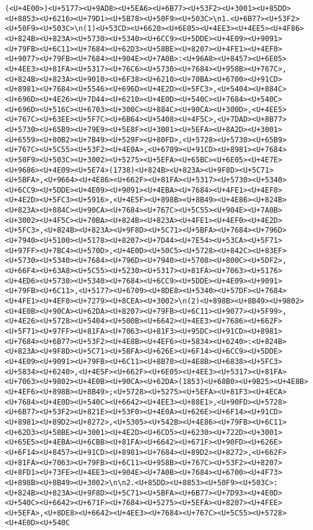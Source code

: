 \documentclass[
]{article}
\begin{document}
\begin{verbatim}
(<U+4E00>)<U+5177><U+9AD8><U+5EA6><U+6B77><U+53F2><U+3001><U+85DD><U+8853><U+6216><U+79D1><U+5B78><U+50F9><U+503C>\n1.<U+6B77><U+53F2><U+50F9><U+503C>\n(1)<U+53CD><U+6620><U+6E05><U+4EE3><U+4EE5><U+4F86><U+824B><U+823A><U+5730><U+5340><U+6CC9><U+5DDE><U+4E09><U+9091><U+79FB><U+6C11><U+7684><U+62D3><U+58BE><U+8207><U+4FE1><U+4EF0><U+9077><U+79FB><U+7684><U+904E><U+7A0B>:<U+96A8><U+8457><U+6E05><U+4EE3><U+81FA><U+5317><U+76C6><U+5730><U+7684><U+958B><U+767C>,<U+824B><U+823A><U+9010><U+6F38><U+6210><U+70BA><U+6700><U+91CD><U+8981><U+7684><U+5546><U+696D><U+4E2D><U+5FC3>,<U+5404><U+884C><U+696D><U+4E26><U+7D44><U+6210><U+4E0D><U+540C><U+7684><U+540C><U+696D><U+516C><U+6703><U+300C><U+884C><U+90CA><U+300D>,<U+4EE5><U+767C><U+63EE><U+5F7C><U+6B64><U+5408><U+4F5C>,<U+7DAD><U+8B77><U+5730><U+65B9><U+79E9><U+5E8F><U+3001><U+5EFA><U+8A2D><U+3001><U+6559><U+80B2><U+7B49><U+529F><U+80FD>,<U+5728><U+5730><U+65B9><U+767C><U+5C55><U+53F2><U+4E0A>,<U+6709><U+91CD><U+8981><U+7684><U+50F9><U+503C><U+3002><U+5275><U+5EFA><U+65BC><U+6E05><U+4E7E><U+9686><U+4E09><U+5E74>(1738)<U+824B><U+823A><U+9F8D><U+5C71><U+5BFA>,<U+9664><U+4E86><U+662F><U+81FA><U+5317><U+5730><U+5340><U+6CC9><U+5DDE><U+4E09><U+9091><U+4EBA><U+7684><U+4FE1><U+4EF0><U+4E2D><U+5FC3><U+5916>,<U+4E5F><U+898B><U+8B49><U+4E86><U+824B><U+823A><U+884C><U+90CA><U+7684><U+767C><U+5C55><U+904E><U+7A0B><U+3002><U+4F5C><U+70BA><U+824B><U+823A><U+4FE1><U+4EF0><U+4E2D><U+5FC3>,<U+824B><U+823A><U+9F8D><U+5C71><U+5BFA><U+7684><U+796D><U+7940><U+5100><U+5178><U+8207><U+7D44><U+7E54><U+53CA><U+5F71><U+97FF><U+7BC4><U+570D>,<U+4E0D><U+50C5><U+5728><U+842C><U+83EF><U+5730><U+5340><U+7684><U+796D><U+7940><U+5708><U+800C><U+5DF2>,<U+66F4><U+63A8><U+5C55><U+5230><U+5317><U+81FA><U+7063><U+5176><U+4ED6><U+5730><U+5340><U+7684><U+6CC9><U+5DDE><U+4E09><U+9091><U+79FB><U+6C11>,<U+5177><U+6709><U+8DE8><U+5340><U+57DF><U+7684><U+4FE1><U+4EF0><U+7279><U+8CEA><U+3002>\n(2)<U+898B><U+8B49><U+9802><U+4E0B><U+90CA><U+62DA><U+8207><U+79FB><U+6C11><U+9077><U+5F99>,<U+4E26><U+5728><U+5404><U+500B><U+6642><U+4EE3><U+7686><U+662F><U+5F71><U+97FF><U+81FA><U+7063><U+81F3><U+95DC><U+91CD><U+8981><U+7684><U+6B77><U+53F2><U+4E8B><U+4EF6><U+5834><U+6240>:<U+824B><U+823A><U+9F8D><U+5C71><U+5BFA><U+626E><U+6F14><U+6CC9><U+5DDE><U+4E09><U+9091><U+79FB><U+6C11><U+8B70><U+4E8B><U+6838><U+5FC3><U+5834><U+6240>,<U+4E5F><U+662F><U+6E05><U+4EE3><U+5317><U+81FA><U+7063><U+9802><U+4E0B><U+90CA><U+62DA>(1853)<U+68B0><U+9B25><U+4E8B><U+4EF6><U+898B><U+8B49>;<U+5728><U+5275><U+5EFA><U+81F3><U+4ECA><U+7684><U+4E0D><U+540C><U+6642><U+4EE3><U+88E1>,<U+90FD><U+5728><U+6B77><U+53F2><U+821E><U+53F0><U+4E0A><U+626E><U+6F14><U+91CD><U+8981><U+89D2><U+8272>,<U+5305><U+542B><U+4E86><U+79FB><U+6C11><U+62D3><U+58BE><U+3001><U+4E2D><U+6CD5><U+6230><U+722D><U+3001><U+65E5><U+4EBA><U+6CBB><U+81FA><U+6642><U+671F><U+90FD><U+626E><U+6F14><U+8457><U+91CD><U+8981><U+7684><U+89D2><U+8272>,<U+662F><U+81FA><U+7063><U+79FB><U+6C11><U+958B><U+767C><U+53F2><U+8207><U+8FD1><U+73FE><U+4EE3><U+904E><U+7A0B><U+7684><U+6700><U+4F73><U+898B><U+8B49><U+3002>\n\n2.<U+85DD><U+8853><U+50F9><U+503C>:<U+824B><U+823A><U+9F8D><U+5C71><U+5BFA><U+6B77><U+7D93><U+4E0D><U+540C><U+6642><U+671F><U+7684><U+5275><U+5EFA><U+8207><U+4FEE><U+5EFA>,<U+8DE8><U+6642><U+4EE3><U+7684><U+767C><U+5C55><U+5728><U+4E0D><U+540C
\end{verbatim}
\end{document}
